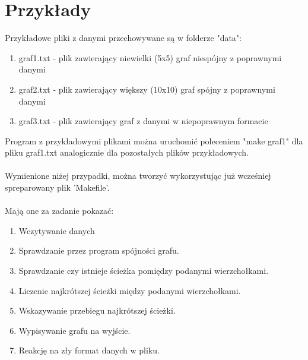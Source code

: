 \documentclass{article}
\begin{document}
\section{Przykłady}

Przykładowe pliki z danymi przechowywane są w folderze "data":
\begin{enumerate}
    \item graf1.txt - plik zawierający niewielki (5x5) graf niespójny z poprawnymi danymi
    \item graf2.txt - plik zawierający większy (10x10) graf spójny z poprawnymi danymi
    \item graf3.txt - plik zawierający graf z danymi w niepoprawnym formacie
\end{enumerate}
Program z przykładowymi plikami można uruchomić poleceniem "make graf1" dla pliku graf1.txt analogicznie dla pozostałych plików przykładowych.
\\\\
Wymienione niżej przypadki, można tworzyć wykorzystując już wcześniej spreparowany plik 'Makefile'.
\\\\
Mają one za zadanie pokazać:
\begin{enumerate}
    \item Wczytywanie danych
    \item Sprawdzanie przez program spójności grafu.
    \item Sprawdzanie czy istnieje ścieżka pomiędzy podanymi wierzchołkami.
    \item Liczenie najkrótszej ścieżki między podanymi wierzchołkami.
    \item Wskazywanie przebiegu najkrótszej ścieżki.
    \item Wypisywanie grafu na wyjście.
    \item Reakcję na zły format danych w pliku.
\end{enumerate}
\end{document}
